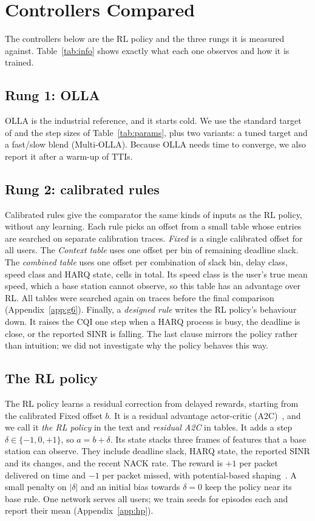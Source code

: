\section{Controllers Compared}\label{sec:controllers}\label{sec:method}
The controllers below are the RL policy and the three rungs it is measured against. Table~\ref{tab:info} shows exactly what each one observes and how it is trained.

\subsection{Rung 1: OLLA}
OLLA is the industrial reference, and it starts cold. We use the standard target of \NCfgOllaTarget{} and the step sizes of Table~\ref{tab:params}, plus two variants: a tuned target and a fast/slow blend (Multi-OLLA). Because OLLA needs time to converge, we also report it after a warm-up of \NWoneTTI{} TTIs.

\subsection{Rung 2: calibrated rules}
Calibrated rules give the comparator the same kinds of inputs as the RL policy, without any learning. Each rule picks an offset from a small table whose entries are searched on separate calibration traces. \emph{Fixed} is a single calibrated offset for all users. The \emph{Context table} uses one offset per bin of remaining deadline slack. The \emph{combined table} uses one offset per combination of slack bin, delay class, speed class and HARQ state, \NGsixCells{} cells in total. Its speed class is the user's true mean speed, which a base station cannot observe, so this table has an advantage over RL. All tables were searched again on \NGsixCalTraces{} traces before the final comparison (Appendix~\ref{app:g6}). Finally, a \emph{designed rule} writes the RL policy's behaviour down. It raises the CQI one step when a HARQ process is busy, the deadline is close, or the reported SINR is falling. The last clause mirrors the policy rather than intuition; we did not investigate why the policy behaves this way.

\subsection{The RL policy}
The RL policy learns a residual correction from delayed rewards, starting from the calibrated Fixed offset $b$. It is a residual advantage actor-critic (A2C)~\cite{mnih2016a3c}, and we call it \emph{the RL policy} in the text and \emph{residual A2C} in tables. It adds a step $\delta\in\{-1,0,+1\}$, so $a=b+\delta$. Its state stacks three frames of  features that a base station can observe. They include deadline slack, HARQ state, the reported SINR and its changes, and the recent NACK rate. The reward is $+1$ per packet delivered on time and $-1$ per packet missed, with potential-based shaping~\cite{ng1999shaping}. A small penalty on $|\delta|$ and an initial bias towards $\delta=0$ keep the policy near its base rule. One network serves all users; we train \NCfgSeeds{} seeds for \NCfgEpDl{} episodes each and report their mean (Appendix~\ref{app:hp}).

